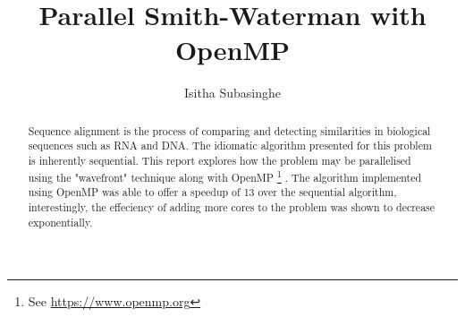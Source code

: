 \documentclass[manuscript,screen, nonacm=true]{acmart}
\begin{document}
\title{Parallel Smith-Waterman with OpenMP}

\author{Isitha Subasinghe}


\renewcommand{\shortauthors}{}

\begin{abstract}
  Sequence alignment is the process of comparing and detecting similarities in biological sequences such as 
  RNA and DNA. The idiomatic algorithm presented for this problem is inherently sequential. This report explores how the problem may be parallelised using the "wavefront" technique along with OpenMP \footnote{See \url{https://www.openmp.org}} . The algorithm implemented using OpenMP was able to offer a speedup of 13 over the sequential algorithm, interestingly, the effeciency of adding more cores to the problem was shown to decrease exponentially. 
\end{abstract}

\maketitle
\end{document}
